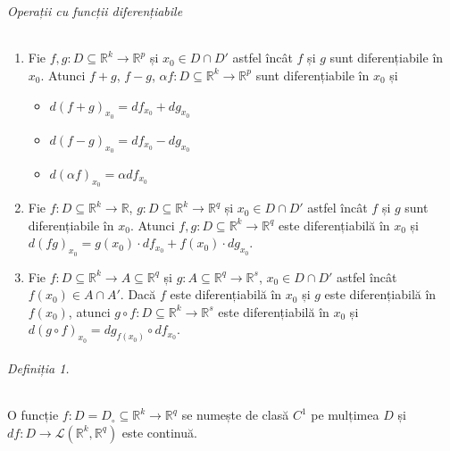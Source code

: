 \part{}
\paragraph{Operații cu funcții diferențiabile}
\begin{enumerate}[label=\emph{\alph*})]
    \item Fie $f, g:D \subseteq \mathbb{R}^{k} \rightarrow \mathbb{R}^{p}$ și $x_{0} \in D \cap D'$ astfel încât $f$ și $g$ sunt diferențiabile în $x_{0}$.
    Atunci $f+g$, $f-g$, $\alpha f:D \subseteq \mathbb{R}^{k} \rightarrow \mathbb{R}^{p}$ sunt diferențiabile în $x_{0}$ și
    \begin{itemize}
      \item $d(f+g)_{x_{0}} = df_{x_{0}} + dg_{x_{0}}$
      \item $d(f-g)_{x_{0}} = df_{x_{0}} - dg_{x_{0}}$
      \item $d(\alpha f)_{x_{0}} = \alpha df_{x_{0}}$
    \end{itemize}
    
    \item Fie $f:D \subseteq \mathbb{R}^{k} \rightarrow \mathbb{R}$, $g:D \subseteq \mathbb{R}^{k} \rightarrow \mathbb{R}^{q}$ și $x_{0} \in D \cap D'$ astfel încât
    $f$ și $g$ sunt diferențiabile în $x_{0}$. Atunci $f,g:D \subseteq \mathbb{R}^{k} \rightarrow \mathbb{R}^{q}$ este diferențiabilă în $x_{0}$ și
    $d(fg)_{x_{0}} = g(x_{0}) \cdot df_{x_{0}} + f(x_{0}) \cdot dg_{x_{0}}$.

    \item Fie $f:D \subseteq \mathbb{R}^{k} \rightarrow A \subseteq \mathbb{R}^{q}$ și $g:A \subseteq \mathbb{R}^{q} \rightarrow \mathbb{R}^{s}$,
    $x_{0} \in D \cap D'$ astfel încât $f(x_{0}) \in A \cap A'$. Dacă $f$ este diferențiabilă în $x_{0}$ și $g$ este diferențiabilă în $f(x_{0})$, atunci
    $g \circ f:D \subseteq \mathbb{R}^{k} \rightarrow \mathbb{R}^{s}$ este diferențiabilă în $x_{0}$ și $d(g \circ f)_{x_{0}} = dg_{f(x_{0})} \circ df_{x_{0}}$.
\end{enumerate}

\paragraph{Definiția 1.}
O funcție $f:D=D_{\circ} \subseteq \mathbb{R}^{k} \rightarrow \mathbb{R}^{q}$ se numește de clasă $C^{1}$ pe mulțimea $D$ și \\
$df:D \rightarrow \mathcal{L}(\mathbb{R}^{k}, \mathbb{R}^{q})$ este continuă.

